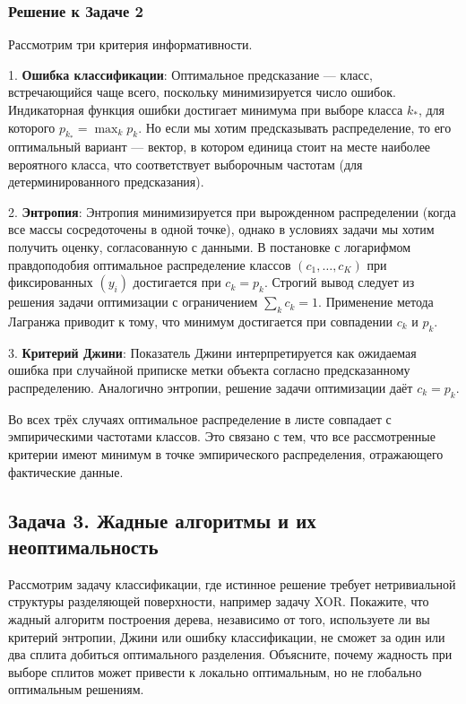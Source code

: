 \subsubsection*{Решение к Задаче 2}

Рассмотрим три критерия информативности.

1. \textbf{Ошибка классификации}: 
Оптимальное предсказание — класс, встречающийся чаще всего, поскольку минимизируется число ошибок. Индикаторная функция ошибки достигает минимума при выборе класса \(k_*\), для которого \(p_{k_*} = \max_k p_k\). Но если мы хотим предсказывать распределение, то его оптимальный вариант — вектор, в котором единица стоит на месте наиболее вероятного класса, что соответствует выборочным частотам (для детерминированного предсказания).

2. \textbf{Энтропия}:
Энтропия минимизируется при вырожденном распределении (когда все массы сосредоточены в одной точке), однако в условиях задачи мы хотим получить оценку, согласованную с данными. В постановке с логарифмом правдоподобия оптимальное распределение классов \((c_1,\ldots,c_K)\) при фиксированных \((y_i)\) достигается при \(c_k = p_k\). Строгий вывод следует из решения задачи оптимизации с ограничением \(\sum_k c_k = 1\). Применение метода Лагранжа приводит к тому, что минимум достигается при совпадении \(c_k\) и \(p_k\).

3. \textbf{Критерий Джини}:
Показатель Джини интерпретируется как ожидаемая ошибка при случайной приписке метки объекта согласно предсказанному распределению. Аналогично энтропии, решение задачи оптимизации даёт \(c_k = p_k\).

Во всех трёх случаях оптимальное распределение в листе совпадает с эмпирическими частотами классов. Это связано с тем, что все рассмотренные критерии имеют минимум в точке эмпирического распределения, отражающего фактические данные.


\subsection*{Задача 3. Жадные алгоритмы и их неоптимальность}

Рассмотрим задачу классификации, где истинное решение требует нетривиальной структуры разделяющей поверхности, например задачу XOR. Покажите, что жадный алгоритм построения дерева, независимо от того, используете ли вы критерий энтропии, Джини или ошибку классификации, не сможет за один или два сплита добиться оптимального разделения. Объясните, почему жадность при выборе сплитов может привести к локально оптимальным, но не глобально оптимальным решениям.

